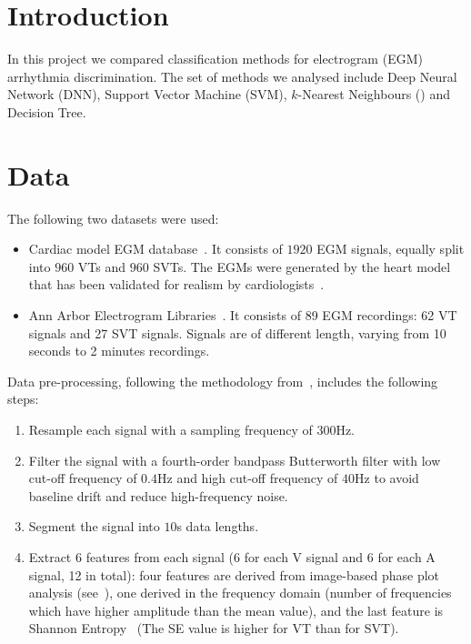 \section{Introduction}
\label{sec:intro}
In this project we compared classification methods for 
electrogram (EGM) arrhythmia discrimination. The set of methods we 
analysed include Deep Neural Network (DNN), Support Vector Machine 
(SVM), $k$-Nearest Neighbours (\knn) and Decision Tree.

\section{Data}
The following two datasets were used: 
\begin{itemize}
	\item Cardiac model EGM database~\cite{jiang2016silico}. 
	It consists
	of $1920$ EGM signals, equally split into $960$ VTs and
	$960$ SVTs. The EGMs were generated by the heart
	model that has been validated for realism by 
	cardiologists~\cite{jiang2016silico}.
	\item Ann Arbor Electrogram Libraries~\cite{egm_data}. It 
	consists of 89 EGM recordings: 62 VT signals and 27 SVT signals. 
	Signals are of different length, varying from 10 seconds to 2 
	minutes recordings. 
\end{itemize}

Data pre-processing, following the methodology 
from~\cite{hajeb2018automated}, includes the following steps:
\begin{enumerate}
	\item Resample each signal with a sampling frequency of $300$Hz.
	\item Filter the signal with a fourth-order bandpass Butterworth 
	filter with low cut-off frequency of $0.4$Hz and high cut-off 
	frequency of $40$Hz to avoid baseline drift and reduce 
	high-frequency noise. 
	\item Segment the signal into $10$s data lengths.
	\item Extract 6 features from each signal (6 for each V signal 
	and 6 for each A signal, 12 in total): four features are derived 
	from image-based phase plot analysis 
	(see~\cite{hajeb2018automated}), one derived in the 
	frequency domain (number of frequencies which have higher 
	amplitude than the mean value), and the last feature is Shannon 
	Entropy~\cite{shannon1948mathematical} (The SE value is higher 
	for VT than for SVT).
\end{enumerate}
